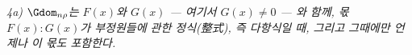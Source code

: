 
\emph{4a) $\Gdom_{n\rho}$는 $F(x)$와 $G(x)$ --- 여기서 $G(x)\ne0$ --- 와 함께, 몫 $F(x):G(x)$가 부정원들에 관한 정식(整式), 즉 다항식일 때, 그리고 그때에만 언제나 이 몫도 포함한다.}
